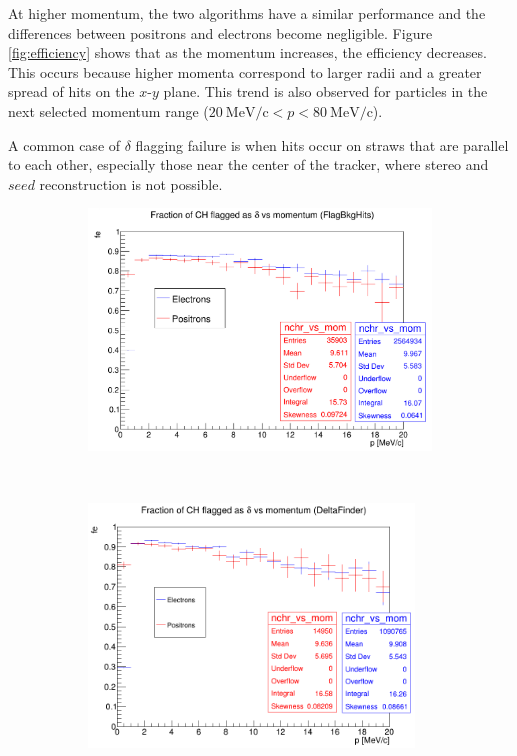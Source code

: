 At higher momentum, the two algorithms have a similar performance and the 
differences between positrons and electrons become negligible. 
Figure \ref{fig:efficiency} shows that as the momentum 
increases, the efficiency decreases. This occurs because 
higher momenta correspond to larger radii and a 
greater spread of hits on the $x$-$y$ plane. This trend is also observed for particles in the 
next selected momentum range ($20 \ \text{MeV/c} <p<80 \ \text{MeV/c}$).

A common case of $\delta$ flagging failure is when hits 
occur on straws that are parallel to each other, especially those near 
the center of the tracker, where stereo and $seed$ reconstruction is not possible. 

\begin{figure}[!h]
    \centering
    \begin{subfigure}[t]{0.5\textwidth}
        \centering
        \includegraphics[width=1.\textwidth]{figures/png/Screenshot_20240818_155835.png}
        \caption{}
        \label{fig:eff1}
    \end{subfigure}%
    ~ 
    \begin{subfigure}[t]{0.5\textwidth}
        \centering
        \includegraphics[width=0.95\textwidth]{figures/png/Screenshot_20240813_203916.png}

\end{subfigure}
\end{figure}
